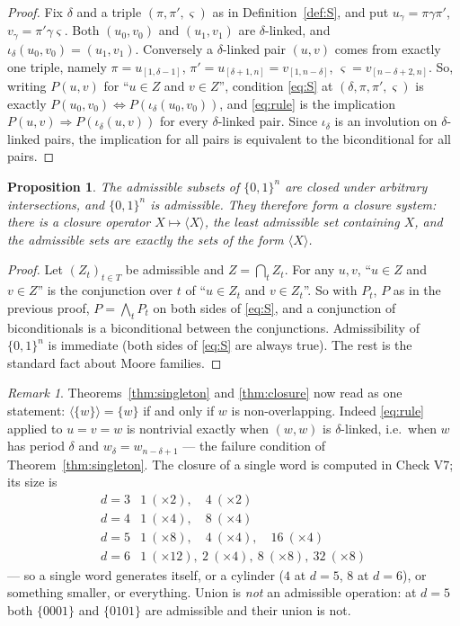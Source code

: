 \documentclass[11pt]{article}
\newtheorem{proposition}[theorem]{Proposition}
\theoremstyle{definition}
\theoremstyle{remark}
\newtheorem{remark}[theorem]{Remark}
\newcommand{\cube}{\{0,1\}}
\begin{document}
\begin{proof}
Fix $\delta$ and a triple $(\pi,\pi',\varsigma)$ as in Definition~\ref{def:S}, and put
$u_\gamma=\pi\gamma\pi'$, $v_\gamma=\pi'\gamma\varsigma$.  Both $(u_0,v_0)$ and $(u_1,v_1)$ are
$\delta$-linked, and $\iota_\delta(u_0,v_0)=(u_1,v_1)$.  Conversely a $\delta$-linked pair
$(u,v)$ comes from exactly one triple, namely $\pi=u_{[1,\delta-1]}$,
$\pi'=u_{[\delta+1,n]}=v_{[1,n-\delta]}$, $\varsigma=v_{[n-\delta+2,n]}$.  So, writing
$P(u,v)$ for ``$u\in Z$ and $v\in Z$'', condition \eqref{eq:S} at $(\delta,\pi,\pi',\varsigma)$
is exactly $P(u_0,v_0)\iff P(\iota_\delta(u_0,v_0))$, and \eqref{eq:rule} is the implication
$P(u,v)\Rightarrow P(\iota_\delta(u,v))$ for every $\delta$-linked pair.  Since $\iota_\delta$ is
an involution on $\delta$-linked pairs, the implication for all pairs is equivalent to the
biconditional for all pairs.
\end{proof}

\begin{proposition}\label{prop:moore}
The admissible subsets of $\cube^{n}$ are closed under arbitrary intersections, and
$\cube^{n}$ is admissible.  They therefore form a closure system: there is a closure operator
$X\mapsto\langle X\rangle$, the least admissible set containing $X$, and the admissible sets are
exactly the sets of the form $\langle X\rangle$.
\end{proposition}

\begin{proof}
Let $(Z_t)_{t\in T}$ be admissible and $Z=\bigcap_t Z_t$.  For any $u,v$, ``$u\in Z$ and $v\in Z$''
is the conjunction over $t$ of ``$u\in Z_t$ and $v\in Z_t$''.  So with $P_t$, $P$ as in the
previous proof, $P=\bigwedge_t P_t$ on both sides of \eqref{eq:S}, and a conjunction of
biconditionals is a biconditional between the conjunctions.  Admissibility of $\cube^{n}$ is
immediate (both sides of \eqref{eq:S} are always true).  The rest is the standard fact about
Moore families.
\end{proof}

\begin{remark}
Theorems~\ref{thm:singleton} and \ref{thm:closure} now read as one statement:
$\langle\{w\}\rangle=\{w\}$ if and only if $w$ is non-overlapping.  Indeed \eqref{eq:rule} applied
to $u=v=w$ is nontrivial exactly when $(w,w)$ is $\delta$-linked, i.e.\ when $w$ has period
$\delta$ and $w_\delta=w_{n-\delta+1}$ --- the failure condition of Theorem~\ref{thm:singleton}.
The closure of a single word is computed in Check V7; its size is
\[
\begin{array}{r|l}
 d=3 & 1\ (\times2),\quad 4\ (\times2)\\
 d=4 & 1\ (\times4),\quad 8\ (\times4)\\
 d=5 & 1\ (\times8),\quad 4\ (\times4),\quad 16\ (\times4)\\
 d=6 & 1\ (\times12),\ 2\ (\times4),\ 8\ (\times8),\ 32\ (\times8)
\end{array}
\]
--- so a single word generates itself, or a cylinder ($4$ at $d=5$, $8$ at $d=6$), or something
smaller, or everything.  Union is \emph{not} an admissible operation: at $d=5$ both
$\{0001\}$ and $\{0101\}$ are admissible and their union is not.
\end{remark}
\end{document}
